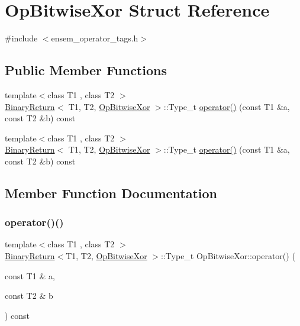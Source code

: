\hypertarget{structOpBitwiseXor}{}\section{Op\+Bitwise\+Xor Struct Reference}
\label{structOpBitwiseXor}


{\ttfamily \#include $<$ensem\+\_\+operator\+\_\+tags.\+h$>$}

\subsection*{Public Member Functions}
\begin{DoxyCompactItemize}
\item 
{\footnotesize template$<$class T1 , class T2 $>$ }\\\mbox{\hyperlink{structBinaryReturn}{Binary\+Return}}$<$ T1, T2, \mbox{\hyperlink{structOpBitwiseXor}{Op\+Bitwise\+Xor}} $>$\+::Type\+\_\+t \mbox{\hyperlink{structOpBitwiseXor_af0ce6a043ad61e902b5303b11a36ce4b}{operator()}} (const T1 \&a, const T2 \&b) const
\item 
{\footnotesize template$<$class T1 , class T2 $>$ }\\\mbox{\hyperlink{structBinaryReturn}{Binary\+Return}}$<$ T1, T2, \mbox{\hyperlink{structOpBitwiseXor}{Op\+Bitwise\+Xor}} $>$\+::Type\+\_\+t \mbox{\hyperlink{structOpBitwiseXor_af0ce6a043ad61e902b5303b11a36ce4b}{operator()}} (const T1 \&a, const T2 \&b) const
\end{DoxyCompactItemize}


\subsection{Member Function Documentation}
\mbox{\label{structOpBitwiseXor_af0ce6a043ad61e902b5303b11a36ce4b}} 
\subsubsection{\texorpdfstring{operator()()}{operator()()}\hspace{0.1cm}{\footnotesize\ttfamily [1/2]}}
{\footnotesize\ttfamily template$<$class T1 , class T2 $>$ \\
\mbox{\hyperlink{structBinaryReturn}{Binary\+Return}}$<$T1, T2, \mbox{\hyperlink{structOpBitwiseXor}{Op\+Bitwise\+Xor}} $>$\+::Type\+\_\+t Op\+Bitwise\+Xor\+::operator() (\begin{DoxyParamCaption}\item[{const T1 \&}]{a,  }\item[{const T2 \&}]{b }\end{DoxyParamCaption}) const\hspace{0.3cm}{\ttfamily [inline]}}

